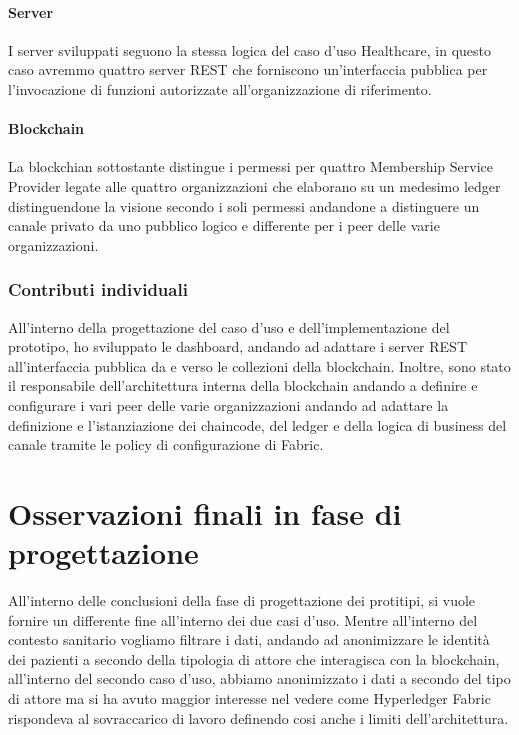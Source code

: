 \paragraph{Server}
I server sviluppati seguono la stessa logica del caso d'uso Healthcare, in questo caso avremmo quattro server REST che forniscono un'interfaccia pubblica per l'invocazione di funzioni autorizzate all'organizzazione di riferimento.
\paragraph{Blockchain}
La blockchian sottostante distingue i permessi per quattro Membership Service Provider legate alle quattro organizzazioni che elaborano su un medesimo ledger distinguendone la visione secondo i soli permessi andandone a distinguere un canale privato da uno pubblico logico e differente per i peer delle varie organizzazioni.
\subsubsection{Contributi individuali}
All'interno della progettazione del caso d'uso e dell'implementazione del prototipo, ho sviluppato le dashboard, andando ad adattare i server REST all'interfaccia pubblica da e verso le collezioni della blockchain. Inoltre, sono stato il responsabile dell'architettura interna della blockchain andando a definire e configurare i vari peer delle varie organizzazioni andando ad adattare la definizione e l'istanziazione dei chaincode, del ledger e della logica di business del canale tramite le policy di configurazione di Fabric.
\section{Osservazioni finali in fase di progettazione}
All'interno delle conclusioni della fase di progettazione dei protitipi, si vuole fornire un differente fine all'interno dei due casi d'uso. Mentre all'interno del contesto sanitario vogliamo filtrare i dati, andando ad anonimizzare le identità dei pazienti a secondo della tipologia di attore che interagisca con la blockchain, all'interno del secondo caso d'uso, abbiamo anonimizzato i dati a secondo del tipo di attore ma si ha avuto maggior interesse nel vedere come Hyperledger Fabric rispondeva al sovraccarico di lavoro definendo cosi anche i limiti dell'architettura.
\newpage 